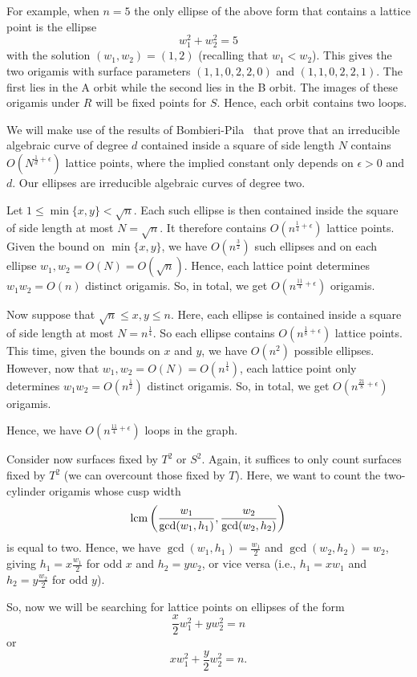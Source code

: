 \documentclass[a4paper,11pt]{amsart}
\numberwithin{equation}{section}
\numberwithin{figure}{section}
\numberwithin{table}{section}
\newcommand{\cuspwidth}{{\rm{lcm}}\left(\frac{w_{1}}{\gcd(w_{1},h_{1})},\frac{w_{2}}{\gcd(w_{2},h_{2})}\right)}
\begin{document}
For example, when $n = 5$ the only ellipse of the above form that contains a lattice point is the ellipse
\[w_{1}^{2} + w_{2}^{2} = 5\]
with the solution $(w_{1},w_{2}) = (1,2)$ (recalling that $w_{1} < w_{2}$). This gives the two origamis with surface parameters $(1,1,0,2,2,0)$ and $(1,1,0,2,2,1)$. The first lies in the A orbit while the second lies in the B orbit. The images of these origamis under $R$ will be fixed points for $S$. Hence, each orbit contains two loops.

We will make use of the results of Bombieri-Pila~\cite[Section 3]{BoPi} that prove that an irreducible algebraic curve of degree $d$ contained inside a square of side length $N$ contains $O(N^{\frac{1}{d}+\epsilon})$ lattice points, where the implied constant only depends on $\epsilon>0$ and $d$. Our ellipses are irreducible algebraic curves of degree two.

Let $1\leq \min\{x,y\} < \sqrt{n}$. Each such ellipse is then contained inside the square of side length at most $N = \sqrt{n}$. It therefore contains $O(n^{\frac{1}{4}+\epsilon})$ lattice points. Given the bound on $\min\{x,y\}$, we have $O(n^{\frac{3}{2}})$ such ellipses and on each ellipse $w_{1},w_{2} = O(N) = O(\sqrt{n})$. Hence, each lattice point determines $w_{1}w_{2}=O(n)$ distinct origamis. So, in total, we get $O(n^{\frac{11}{4} + \epsilon})$ origamis.

Now suppose that $\sqrt{n}\leq x,y \leq n$. Here, each ellipse is contained inside a square of side length at most $N = n^{\frac{1}{4}}$. So each ellipse contains $O(n^{\frac{1}{8}+\epsilon})$ lattice points. This time, given the bounds on $x$ and $y$, we have $O(n^{2})$ possible ellipses. However, now that $w_{1},w_{2} = O(N) = O(n^{\frac{1}{4}})$, each lattice point only determines $w_1w_2 = O(n^{\frac{1}{2}})$ distinct origamis. So, in total, we get $O(n^{\frac{21}{8}+\epsilon})$ origamis.

Hence, we have $O(n^{\frac{11}{4}+\epsilon})$ loops in the graph.

Consider now surfaces fixed by $T^2$ or $S^2$. Again, it suffices to only count surfaces fixed by $T^2$ (we can overcount those fixed by $T$). Here, we want to count the two-cylinder origamis whose cusp width
\[\cuspwidth\]
is equal to two. Hence, we have $\gcd(w_{1},h_{1}) = \frac{w_{1}}{2}$ and $\gcd(w_{2},h_{2}) = w_{2}$, giving $h_{1} = x\frac{w_{1}}{2}$ for odd $x$ and $h_{2} = yw_{2}$, or vice versa (i.e., $h_{1} = xw_{1}$ and $h_{2} = y\frac{w_{2}}{2}$ for odd $y$).

So, now we will be searching for lattice points on ellipses of the form
\[\frac{x}{2}w_{1}^{2} + yw_{2}^{2} = n\]
or
\[xw_{1}^{2} + \frac{y}{2}w_{2}^{2} = n.\]
\end{document}
